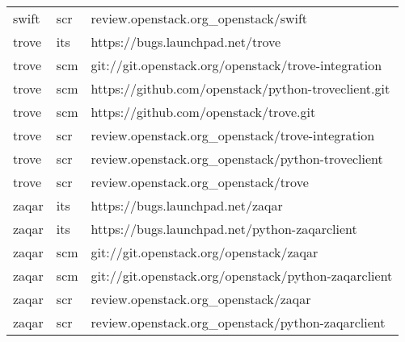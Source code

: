 \begin{center}
\begin{longtable}{|p{4cm}|p{1cm}|p{10cm}|}
swift&scr&review.openstack.org\_openstack/swift\\ 
trove&its&https://bugs.launchpad.net/trove\\ 
trove&scm&git://git.openstack.org/openstack/trove-integration\\ 
trove&scm&https://github.com/openstack/python-troveclient.git\\ 
trove&scm&https://github.com/openstack/trove.git\\ 
trove&scr&review.openstack.org\_openstack/trove-integration\\ 
trove&scr&review.openstack.org\_openstack/python-troveclient\\ 
trove&scr&review.openstack.org\_openstack/trove\\ 
zaqar&its&https://bugs.launchpad.net/zaqar\\ 
zaqar&its&https://bugs.launchpad.net/python-zaqarclient\\ 
zaqar&scm&git://git.openstack.org/openstack/zaqar\\ 
zaqar&scm&git://git.openstack.org/openstack/python-zaqarclient\\ 
zaqar&scr&review.openstack.org\_openstack/zaqar\\ 
zaqar&scr&review.openstack.org\_openstack/python-zaqarclient

\hline
\end{longtable}
\end{center}

 
